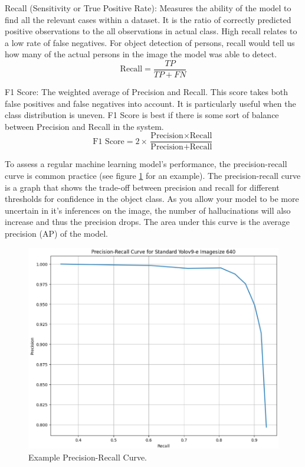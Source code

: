 Recall (Sensitivity or True Positive Rate): Measures the ability of the model to find all the relevant cases within a dataset. It is the ratio of correctly predicted positive observations to the all observations in actual class. High recall relates to a low rate of false negatives. For object detection of persons, recall would tell us how many of the actual persons in the image the model was able to detect.
\begin{equation}
    \text{Recall} = \frac{TP}{TP + FN}	
\end{equation}

F1 Score: The weighted average of Precision and Recall. This score takes both false positives and false negatives into account. It is particularly useful when the class distribution is uneven. F1 Score is best if there is some sort of balance between Precision and Recall in the system.
\begin{equation}
    \text{F1 Score} = 2 \times \frac{\text{Precision} \times \text{Recall}}{\text{Precision} + \text{Recall}}
\end{equation}

To assess a regular machine learning model's performance, the precision-recall curve is common practice (see figure \ref{fig:precisionrecallcurveexample} for an example). The precision-recall curve is a graph that shows the trade-off between precision and recall for different thresholds for confidence in the object class. As you allow your model to be more uncertain in it's inferences on the image, the number of hallucinations will also increase and thus the precision drops. The area under this curve is the average precision (AP) of the model. 

\begin{figure}
    \centering
    \includegraphics[width=0.7\linewidth]{Images/Results/PR-curve standard e 640.png}
    \caption{Example Precision-Recall Curve.}
    \label{fig:precisionrecallcurveexample}
\end{figure}


